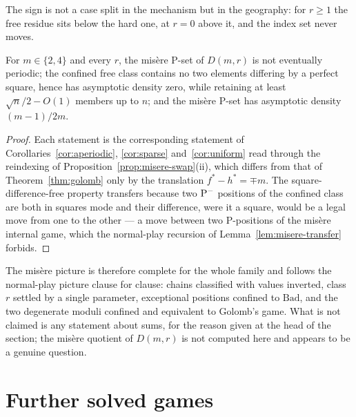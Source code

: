 The sign is not a case split in the mechanism but in the geography: for
$r \ge 1$ the free residue sits below the hard one, at $r = 0$ above it,
and the index set never moves.

\begin{corollary}\label{cor:misere-density}
For $m \in \{2,4\}$ and every $r$, the mis\`ere P-set of $D(m,r)$ is not
eventually periodic; the confined free class contains no two elements
differing by a perfect square, hence has asymptotic density zero, while
retaining at least $\sqrt{n}/2 - O(1)$ members up to $n$; and the
mis\`ere P-set has asymptotic density $(m-1)/2m$.
\end{corollary}
\begin{proof}
Each statement is the corresponding statement of
Corollaries~\ref{cor:aperiodic}, \ref{cor:sparse} and~\ref{cor:uniform}
read through the reindexing of
Proposition~\ref{prop:misere-swap}(ii), which differs from that of
Theorem~\ref{thm:golomb} only by the translation $f^* - h^* = \mp m$. The
square-difference-free property transfers because two $\mathrm{P}^-$ positions
of the confined class are both in squares mode and their difference, were
it a square, would be a legal move from one to the other --- a move
between two P-positions of the mis\`ere internal game, which the
normal-play recursion of Lemma~\ref{lem:misere-transfer} forbids.
\end{proof}

\begin{remark}\label{rem:misere-complete}
The mis\`ere picture is therefore complete for the whole family and
follows the normal-play picture clause for clause: chains classified with
values inverted, class $r$ settled by a single parameter, exceptional
positions confined to $\mathrm{Bad}$, and the two degenerate moduli
confined and equivalent to Golomb's game. What is not claimed is any
statement about sums, for the reason given at the head of the section;
the mis\`ere quotient of $D(m,r)$ is not computed here and appears to be
a genuine question.
\end{remark}

\section{Further solved games}\label{sec:examples}

